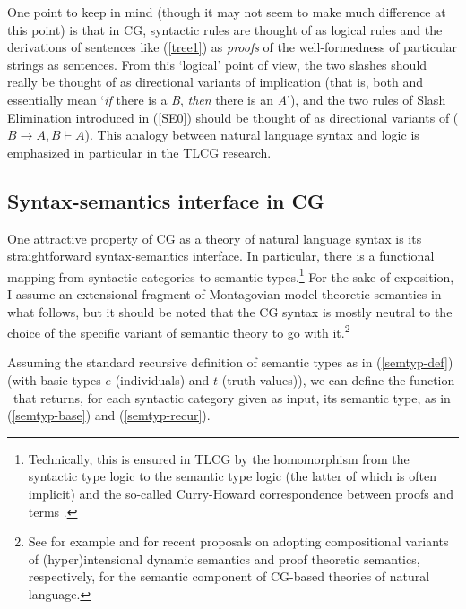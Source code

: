 \documentclass[output=paper]{langsci/langscibook}
\begin{document}
One point to keep in mind (though it may not seem to make much
difference at this point) is that in CG, syntactic rules are
thought of as logical rules and the derivations of sentences like
(\ref{tree1}) as \emph{proofs} of the well-formedness of
particular strings as sentences.
From this `logical' point of view, the two slashes should really be
thought of as directional variants of implication (that is, both
 and  essentially mean `\emph{if} there is a \textit{B},
\emph{then} there is an \textit{A}'), and the two rules of Slash Elimination
introduced in (\ref{SE0})
should be thought of as directional variants of 
($B \ensuremath{ \rightarrow } A, B  \ensuremath{\vdash\xspace } A$). This analogy between natural language
syntax and logic is emphasized in particular in the TLCG research.


\subsection{Syntax-semantics interface in CG \label{interface}}

One attractive property of CG as a theory of natural language syntax
is its straightforward syntax-semantics
interface. In particular, there is a 
functional mapping from syntactic categories to semantic
types.\footnote{Technically, this is ensured in TLCG by the 
homomorphism from the syntactic type logic to the semantic type logic
(the latter of which is often implicit) and the so-called Curry-Howard
correspondence between proofs and terms \citep{vanBenthem88}.}
For the sake of exposition, I assume an extensional fragment of
Montagovian model-theoretic semantics in what follows, but it should be noted that the
CG syntax is mostly neutral to the choice of the specific variant of
semantic theory to go with it.\footnote{See for example \citet{martin2013} and
\citet{bekkimineshima17} for recent proposals on adopting compositional variants
of (hyper)intensional dynamic semantics and proof theoretic semantics,
respectively, for the semantic component of CG-based theories of
natural language.}

Assuming the standard recursive definition of semantic types
as in (\ref{semtyp-def}) (with basic types $e$ (individuals) and $t$ (truth
values)), we can define the function \SemTyp\ that returns, for each
syntactic category given as input, its semantic type, as in
(\ref{semtyp-base}) and (\ref{semtyp-recur}).
\end{document}
